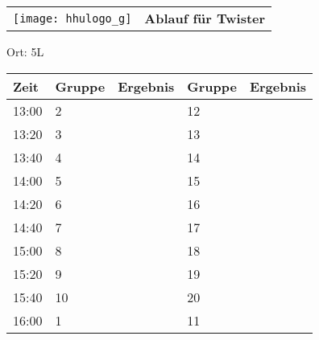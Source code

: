 \documentclass[a4paper,10pt]{article}
\def\spielb{Twister}
\def\raumb{5L}
\begin{document}
  \begin{tabularx}{\textwidth}{lc}
    \texttt{[image: hhulogo\_g]}
  & {\Huge \textbf{Ablauf für \spielb}}
  \end{tabularx}
  \LARGE
  \begin{center}
    \vspace{1cm} 
    Ort: \raumb
  \end{center}
    \vspace{2cm} 
    \begin{tabularx}{\textwidth}{X||X|X||X|X}
	\textbf{Zeit} &\textbf{Gruppe} & \textbf{Ergebnis} &\textbf{Gruppe} & \textbf{Ergebnis}  	\\ \hline \hline
	13:00 &	2	&	&12	&	\\ \hline
	13:20 &	3	&	&13	&	\\ \hline
	13:40 &	4	&	&14	&	\\ \hline

	14:00 &	5	&	&15	&	\\ \hline
	14:20 &	6	&	&16	&	\\ \hline
	14:40 &	7	&	&17	&	\\ \hline

	15:00 &	8	&	&18	&	\\ \hline
	15:20 &	9	&	&19	&	\\ \hline
	15:40 &	10	&	&20	&	\\ \hline

	16:00 &	1	&	&11	&	\\ \hline
      
    \end{tabularx}
   
   \newpage
\end{document}
